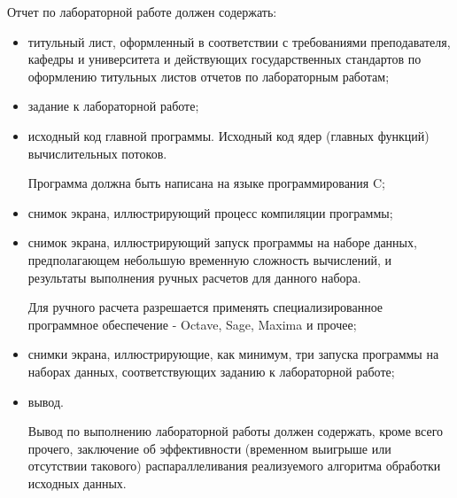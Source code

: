 
Отчет по лабораторной работе должен содержать:

\begin{itemize}

	\item титульный лист, оформленный в соответствии с требованиями преподавателя, кафедры и университета и действующих государственных стандартов по оформлению титульных листов отчетов по лабораторным работам;
	
	\item задание к лабораторной работе;

	\item исходный код главной программы. Исходный код ядер (главных функций) вычислительных потоков.

	Программа должна быть написана на языке программирования C;

	\item снимок экрана, иллюстрирующий процесс компиляции программы;

	\item снимок экрана, иллюстрирующий запуск программы на наборе данных, предполагающем небольшую временную сложность вычислений, и результаты выполнения ручных расчетов для данного набора.

	Для ручного расчета разрешается применять специализированное программное обеспечение - Octave, Sage, Maxima и прочее;

	\item снимки экрана, иллюстрирующие, как минимум, три запуска программы на наборах данных, соответствующих заданию к лабораторной работе;

	\item вывод.

	Вывод по выполнению лабораторной работы должен содержать, кроме всего прочего, заключение об эффективности (временном выигрыше или отсутствии такового) распараллеливания реализуемого алгоритма обработки исходных данных.

\end{itemize}

